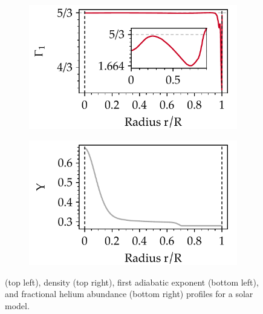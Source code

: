 \begin{figure}
\begin{subfigure}[b]{0.5\linewidth}
    \end{subfigure}\\
    \begin{subfigure}[b]{0.5\linewidth}
        \centering
        \includegraphics[width=\textwidth,keepaspectratio]{figs/pulse/diffs/prof_D-Gamma1.pdf}%
    \end{subfigure}%
    \begin{subfigure}[b]{0.5\linewidth}
        \centering
        \includegraphics[width=\textwidth,keepaspectratio]{figs/pulse/diffs/prof_D-Y.pdf}%
    \end{subfigure}
    \caption[The Sun's internal mechanical, thermal, and chemical profile]{ (top left), density (top right), first adiabatic exponent (bottom left), and fractional helium abundance (bottom right) profiles for a solar model. 
    \label{fig:profs} } 
    \vspace*{1cm}

\end{figure}
